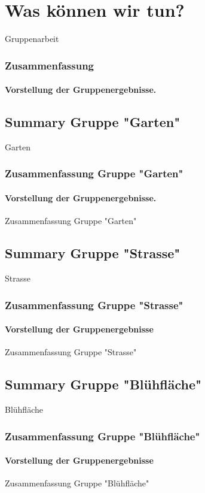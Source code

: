 \documentclass[aspectratio=43]{beamer}
\begin{document}

\section{Was können wir tun?}

\begin{frame}{Gruppenarbeit}
\frametitle{Zusammenfassung} 
\framesubtitle{Vorstellung der Gruppenergebnisse.}
\end{frame}
\subsection[Garten]{Summary Gruppe "Garten"}


\begin{frame}{Garten}
	\frametitle{Zusammenfassung Gruppe "Garten"} 
	\framesubtitle{Vorstellung der Gruppenergebnisse.}
	Zusammenfassung Gruppe "Garten"
\end{frame}

\subsection[Strasse]{Summary Gruppe "Strasse"}

\begin{frame}{Strasse}
\frametitle{Zusammenfassung Gruppe "Strasse"} 
\framesubtitle{Vorstellung der Gruppenergebnisse}
Zusammenfassung Gruppe "Strasse"
\end{frame}

\subsection[Blühfläche]{Summary Gruppe "Blühfläche"}

\begin{frame}{Blühfläche}
\frametitle{Zusammenfassung Gruppe "Blühfläche"} 
\framesubtitle{Vorstellung der Gruppenergebnisse}
Zusammenfassung Gruppe "Blühfläche"
\end{frame}
\end{document}
